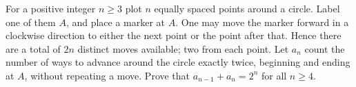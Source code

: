 For a positive integer $n\geq 3$ plot $n$ equally spaced points around a circle.  Label one of them $A$,  and place a marker at $A$.  One may move the marker forward in a clockwise direction to either the next point or the point after that.  Hence there are a total of $2n$ distinct moves available; two from each point.  Let $a_n$ count the number of ways to advance around the circle exactly twice, beginning and ending at $A$,  without repeating a move.  Prove that $a_{n-1}+a_n=2^n$ for all $n\geq 4$.